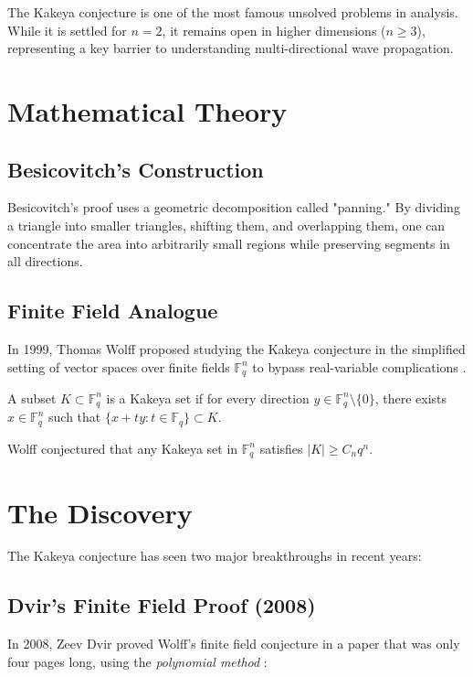 \begin{historicalbox}
The Kakeya conjecture is one of the most famous unsolved problems in analysis. While it is settled for $n=2$, it remains open in higher dimensions ($n \geq 3$), representing a key barrier to understanding multi-directional wave propagation.
\end{historicalbox}

\section{Mathematical Theory}

\subsection{Besicovitch's Construction}
Besicovitch's proof uses a geometric decomposition called "panning." By dividing a triangle into smaller triangles, shifting them, and overlapping them, one can concentrate the area into arbitrarily small regions while preserving segments in all directions.

\subsection{Finite Field Analogue}
In 1999, Thomas Wolff proposed studying the Kakeya conjecture in the simplified setting of vector spaces over finite fields $\mathbb{F}_q^n$ to bypass real-variable complications \cite{wolff1999}.
\begin{definition}
A subset $K \subset \mathbb{F}_q^n$ is a Kakeya set if for every direction $y \in \mathbb{F}_q^n \setminus \{0\}$, there exists $x \in \mathbb{F}_q^n$ such that $\{x + t y : t \in \mathbb{F}_q\} \subset K$.
\end{definition}
Wolff conjectured that any Kakeya set in $\mathbb{F}_q^n$ satisfies $|K| \geq C_n q^n$.

\section{The Discovery}

The Kakeya conjecture has seen two major breakthroughs in recent years:

\subsection{Dvir's Finite Field Proof (2008)}
In 2008, Zeev Dvir proved Wolff's finite field conjecture in a paper that was only four pages long, using the \emph{polynomial method} \cite{dvir2009}:

